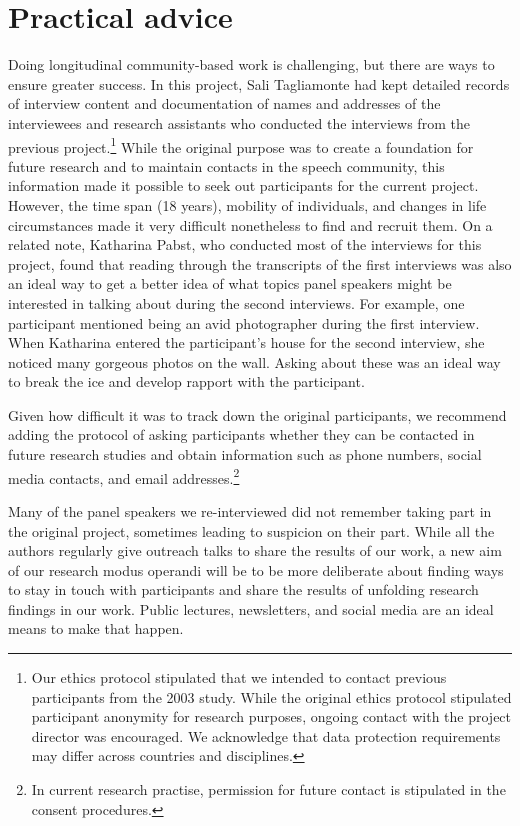 \documentclass[output=paper]{langscibook}
\begin{document}
\section{Practical advice}
\label{sec:pabst:5}

Doing longitudinal community-based work is challenging, but there are ways to ensure greater success. In this project, Sali Tagliamonte had kept detailed records of interview content and documentation of names and addresses of the interviewees and research assistants who conducted the interviews from the previous project.\footnote{Our ethics protocol stipulated that we intended to contact previous participants from the 2003 study. While the original ethics protocol stipulated participant anonymity for research purposes, ongoing contact with the project director was encouraged. We acknowledge that data protection requirements may differ across countries and disciplines.} While the original purpose was to create a foundation for future research and to maintain contacts in the speech community, this information made it possible to seek out participants for the current project. However, the time span (18 years), mobility of individuals, and changes in life circumstances made it very difficult nonetheless to find and recruit them. On a related note, Katharina Pabst, who conducted most of the interviews for this project, found that reading through the transcripts of the first interviews was also an ideal way to get a better idea of what topics panel speakers might be interested in talking about during the second interviews. For example, one participant mentioned being an avid photographer during the first interview. When Katharina entered the participant’s house for the second interview, she noticed many gorgeous photos on the wall. Asking about these was an ideal way to break the ice and develop rapport with the participant.



Given how difficult it was to track down the original participants, we recommend adding the protocol of asking participants whether they can be contacted in future research studies and obtain information such as phone numbers, social media contacts, and email addresses.\footnote{In current research practise, permission for future contact is stipulated in the consent procedures.}



Many of the panel speakers we re-interviewed did not remember taking part in the original project, sometimes leading to suspicion on their part. While all the authors regularly give outreach talks to share the results of our work, a new aim of our research modus operandi will be to be more deliberate about finding ways to stay in touch with participants and share the results of unfolding research findings in our work. Public lectures, newsletters, and social media are an ideal means to make that happen.
\end{document}
